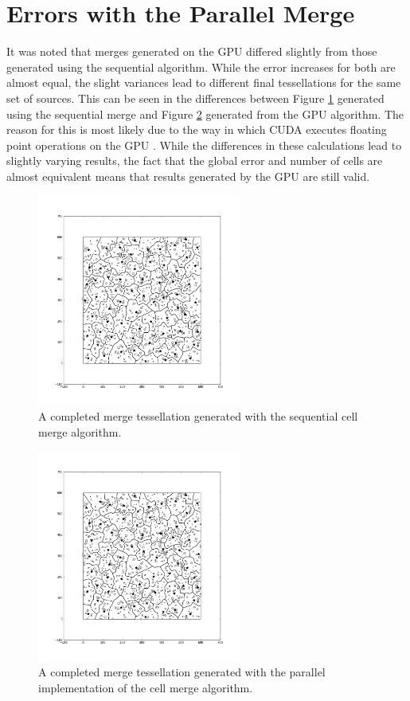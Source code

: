 \section{Errors with the Parallel Merge}
It was noted that merges generated on the GPU differed slightly from those generated using the sequential algorithm. While the error increases for both are almost equal, the slight variances lead to different final tessellations for the same set of sources. This can be seen in the differences between Figure \ref{gpu:fig:seqm} generated using the sequential merge and Figure \ref{gpu:fig:parm} generated from the GPU algorithm. The reason for this is most likely due to the way in which CUDA executes floating point operations on the GPU \citep{CUDA}. While the differences in these calculations lead to slightly varying results, the fact that the global error and number of cells are almost equivalent means that results generated by the GPU are still valid.
\begin{figure}[H]
\centering
\includegraphics[width=0.6\textwidth]{Images/cpu_merge.png}
\caption{A completed merge tessellation generated with the sequential cell merge algorithm.}
\label{gpu:fig:seqm}
\end{figure}
\begin{figure}[H]
\centering
\includegraphics[width=0.6\textwidth]{Images/gpu_merge.png}
\caption{A completed merge tessellation generated with the parallel implementation of the cell merge algorithm.}
\label{gpu:fig:parm}
\end{figure}

